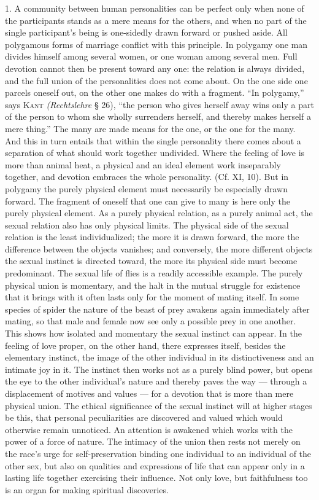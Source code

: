 \documentclass[12pt,a4paper,openany]{book}
\newcommand{\opage}[1]{\marginnote{\footnotesize\textit{[#1]}}}
\begin{document}
1. A community between human personalities can be perfect only when none of the participants stands as a mere means
for the others, and when no part of the single participant's being is one-sidedly drawn forward or pushed aside. All
polygamous forms of marriage conflict with this principle. In polygamy one man divides himself among several women, or
one woman among several men. Full devotion cannot then be present toward any one: the relation is always divided, and
the full union of the personalities does not come about. On the one side one parcels oneself out, on the other one makes
do with a fragment. ``In polygamy,'' says \textsc{Kant} \textit{(Rechtslehre} § 26), ``the person who gives herself away
wins only a part of the person to whom she wholly surrenders herself, and thereby makes herself a mere thing.''%
The many are made means for the one, or the one for the many. And this in turn entails that within the single
personality there comes about a separation
\opage{287}of what should work together undivided. Where the feeling of love is more than animal heat, a physical and an
ideal element work inseparably together, and devotion embraces the whole personality. (Cf. XI, 10). But in polygamy the
purely physical element must necessarily be especially drawn forward. The fragment of oneself that one can give to many
is here only the purely physical element. As a purely physical relation, as a purely animal act, the sexual relation
also has only physical limits. The physical side of the sexual relation is the least individualized; the more it is
drawn forward, the more the difference between the objects vanishes; and conversely, the more different objects the
sexual instinct is directed toward, the more its physical side must become predominant. The sexual life of flies is a
readily accessible example. The purely physical union is momentary, and the halt in the mutual struggle for existence
that it brings with it often lasts only for the moment of mating itself. In some species of spider the nature of the
beast of prey awakens again immediately after mating, so that male and female now see only a possible prey in one
another. This shows how isolated and momentary the sexual instinct can appear. In the feeling of love proper, on the
other hand, there expresses itself, besides the elementary instinct, the image of the other individual in its
distinctiveness and an intimate joy in it. The instinct then works not as a purely blind power, but opens the eye to
the other individual's nature and thereby paves the way --- through a displacement of motives and values --- for a
devotion that is more than mere physical union. The ethical significance of the sexual instinct will at higher stages
be this, that personal peculiarities are discovered and valued which would otherwise remain unnoticed. An attention is
awakened which works with the power of a force of nature. The intimacy of the union then rests not merely on the race's
urge for self-preservation binding one individual to an individual of the other sex, but also on qualities and
expressions of life that can appear only in a lasting life together exercising their influence. Not only love, but
faithfulness too is an organ for making spiritual discoveries.
\end{document}
